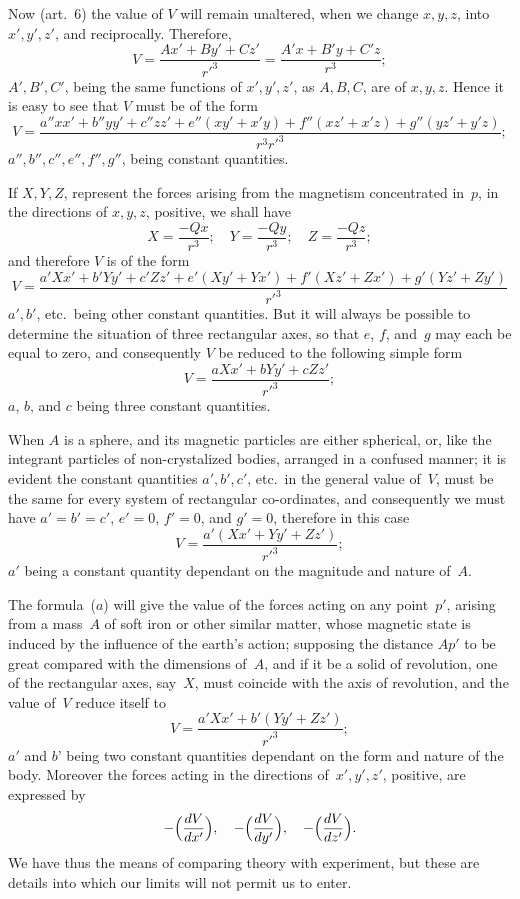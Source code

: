 \documentclass[12pt,notitlepage]{amsart}
\begin{document}
Now (art.~6) the value of $V$ will remain unaltered, when we change
$x,y,z$, into~$x',y',z'$, and reciprocally. Therefore,
\[
V=\frac{Ax'+By'+Cz'}{r'^3}
=\frac{A'x+B'y+C'z}{r^3};
\]
$A',B',C'$, being the same functions of $x',y',z'$, as $A,B,C$, are of
$x,y,z$. Hence it is easy to see that $V$ must be of the form
\[
V=\frac{a''xx'+b''yy'+c''zz'+e''(xy'+x'y)+f''(xz'+x'z)+g''(yz'+y'z)}{r^3r'^3};
\]
$a'',b'',c'',e'',f'',g''$, being constant quantities.

If $X, Y, Z$, represent the forces arising from the magnetism concentrated
in~$p$, in the directions of $x,y,z$, positive, we shall have
\[
X=\frac{-Qx}{r^3};\quad
Y=\frac{-Qy}{r^3};\quad
Z=\frac{-Qz}{r^3};
\]
and therefore $V$ is of the form
\[
V=\frac{a'Xx'+b'Yy'+c'Zz'+e'(Xy'+Yx')+f'(Xz'+Zx')+g'(Yz'+Zy')}{r'^3}
\]
$a',b'$, etc.\ being other constant quantities.
But it will always be possible to
determine the situation of three rectangular axes, so that $e$, $f$,
and~$g$ may
each be equal to zero, and consequently $V$ be reduced to the following
simple form
\[
\tag{$a$.}
V=\frac{aXx'+bYy'+cZz'}{r'^3};
\]
$a$, $b$, and $c$ being three constant quantities.

When $A$ is a sphere, and its magnetic particles are either spherical,
or, like the integrant particles of non-crystalized bodies, arranged in a 
confused manner; it is evident the constant quantities $a',b',c'$, etc.\ in the
general value of~$V$, must be the same for every system of rectangular
co-ordinates, and consequently we must have $a'=b'=c'$, $e'=0$, $f'=0$,
and $g'=0$, therefore in this case
\[
\tag{$b$.}
V=\frac{a'(Xx'+Yy'+Zz')}{r'^3};
\]
$a'$ being a constant quantity dependant on the magnitude and nature of~$A$.

The formula~($a$) will give the value of the forces acting on any
point~$p'$, arising from a mass~$A$ of soft iron or other similar matter, whose
magnetic state is induced by the influence of the earth's action; supposing the
distance $Ap'$ to be great compared with the dimensions of~$A$, and if it be a
solid of revolution, one of the rectangular axes, say~$X$, must coincide with
the axis of revolution, and the value of~$V$ reduce itself to
\[
V=\frac{a'Xx'+b'(Yy'+Zz')}{r'^3};
\]
$a'$ and $b$' being two constant quantities dependant on the form and nature of
the body. Moreover the forces acting in the directions of~$x',y',z'$, positive,
are expressed by
\[
-\Bigl(\frac{dV}{dx'}\Bigr),\quad
-\Bigl(\frac{dV}{dy'}\Bigr),\quad
-\Bigl(\frac{dV}{dz'}\Bigr).
\]
We have thus the means of comparing theory with experiment, but these are
details into which our limits will not permit us to enter.
\end{document}
